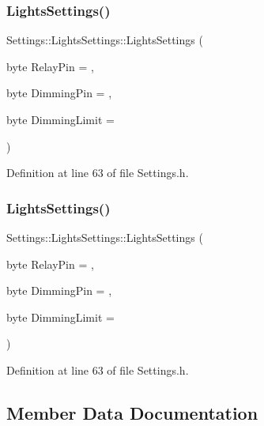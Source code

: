 \subsubsection{\texorpdfstring{Lights\+Settings()}{LightsSettings()}\hspace{0.1cm}{\footnotesize\ttfamily [1/2]}}
{\footnotesize\ttfamily Settings\+::\+Lights\+Settings\+::\+Lights\+Settings (\begin{DoxyParamCaption}\item[{byte}]{Relay\+Pin = {},  }\item[{byte}]{Dimming\+Pin = {},  }\item[{byte}]{Dimming\+Limit = {} }\end{DoxyParamCaption})\hspace{0.3cm}{\ttfamily [inline]}}



Definition at line 63 of file Settings.\+h.

\mbox{\label{struct_settings_1_1_lights_settings_a1544965041d8368ad0303a91689314af}} 
\subsubsection{\texorpdfstring{Lights\+Settings()}{LightsSettings()}\hspace{0.1cm}{\footnotesize\ttfamily [2/2]}}
{\footnotesize\ttfamily Settings\+::\+Lights\+Settings\+::\+Lights\+Settings (\begin{DoxyParamCaption}\item[{byte}]{Relay\+Pin = {},  }\item[{byte}]{Dimming\+Pin = {},  }\item[{byte}]{Dimming\+Limit = {} }\end{DoxyParamCaption})\hspace{0.3cm}{\ttfamily [inline]}}



Definition at line 63 of file Settings.\+h.



\subsection{Member Data Documentation}
\mbox{\label{struct_settings_1_1_lights_settings_a41f736a9f233324844386e49779dbfb6}} 
